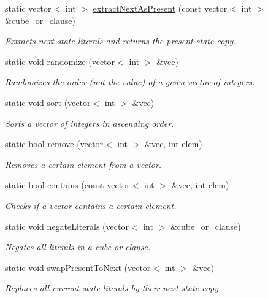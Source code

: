 \begin{DoxyCompactItemize}
static vector$<$ int $>$ \hyperlink{classUtils_a9251f04947864aaaac7e459987913429}{extract\-Next\-As\-Present} (const vector$<$ int $>$ \&cube\-\_\-or\-\_\-clause)
\begin{DoxyCompactList}\small\item\em Extracts next-\/state literals and returns the present-\/state copy. \end{DoxyCompactList}\item 
static void \hyperlink{classUtils_a71efa1aa570b356a328e95008fb65ad8}{randomize} (vector$<$ int $>$ \&vec)
\begin{DoxyCompactList}\small\item\em Randomizes the order (not the value) of a given vector of integers. \end{DoxyCompactList}\item 
static void \hyperlink{classUtils_a2843ae3d849c66ebd72baea26fbd7580}{sort} (vector$<$ int $>$ \&vec)
\begin{DoxyCompactList}\small\item\em Sorts a vector of integers in ascending order. \end{DoxyCompactList}\item 
static bool \hyperlink{classUtils_a15b142132eb40445f51b1f1bb89b85f3}{remove} (vector$<$ int $>$ \&vec, int elem)
\begin{DoxyCompactList}\small\item\em Removes a certain element from a vector. \end{DoxyCompactList}\item 
static bool \hyperlink{classUtils_a84611c8a027ac12426219cb4d59765aa}{contains} (const vector$<$ int $>$ \&vec, int elem)
\begin{DoxyCompactList}\small\item\em Checks if a vector contains a certain element. \end{DoxyCompactList}\item 
static void \hyperlink{classUtils_ae7584589e0d06005fe893fdb9244483a}{negate\-Literals} (vector$<$ int $>$ \&cube\-\_\-or\-\_\-clause)
\begin{DoxyCompactList}\small\item\em Negates all literals in a cube or clause. \end{DoxyCompactList}\item 
static void \hyperlink{classUtils_a8e0d236cf00a61a34ef5c48bcb08a1ec}{swap\-Present\-To\-Next} (vector$<$ int $>$ \&vec)
\begin{DoxyCompactList}\small\item\em Replaces all current-\/state literals by their next-\/state copy. \end{DoxyCompactList}\item 

\end{DoxyCompactItemize}
